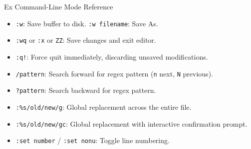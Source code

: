 \begin{cheatbox}{Ex Command-Line Mode Reference}
\begin{itemize}[leftmargin=1.5em]
    \item \texttt{:w}: Save buffer to disk. \texttt{:w filename}: Save As.
    \item \texttt{:wq} or \texttt{:x} or \texttt{ZZ}: Save changes and exit editor.
    \item \texttt{:q!}: Force quit immediately, discarding unsaved modifications.
    \item \texttt{/pattern}: Search forward for regex pattern (\texttt{n} next, \texttt{N} previous).
    \item \texttt{?pattern}: Search backward for regex pattern.
    \item \texttt{:\%s/old/new/g}: Global replacement across the entire file.
    \item \texttt{:\%s/old/new/gc}: Global replacement with interactive confirmation prompt.
    \item \texttt{:set number} / \texttt{:set nonu}: Toggle line numbering.
\end{itemize}
\end{cheatbox}
